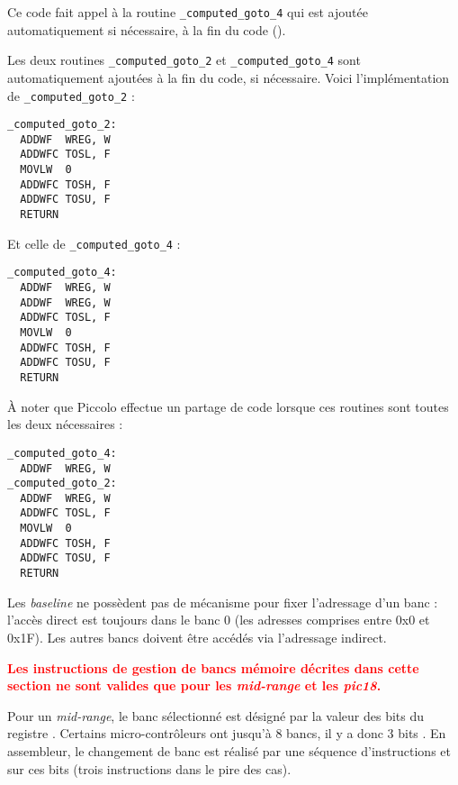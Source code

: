 Ce code fait appel à la routine \texttt{\_computed\_goto\_4} qui est ajoutée automatiquement si nécessaire, à la fin du code (). 





Les deux routines \texttt{\_computed\_goto\_2} et \texttt{\_computed\_goto\_4} sont automatiquement ajoutées à la fin du code, si nécessaire. Voici l'implémentation de \texttt{\_computed\_goto\_2} :
\begin{lstlisting}[language=assembleur]
_computed_goto_2:
  ADDWF  WREG, W
  ADDWFC TOSL, F
  MOVLW  0
  ADDWFC TOSH, F
  ADDWFC TOSU, F
  RETURN
\end{lstlisting}

Et celle de \texttt{\_computed\_goto\_4} :
\begin{lstlisting}[language=assembleur]
_computed_goto_4:
  ADDWF  WREG, W
  ADDWF  WREG, W
  ADDWFC TOSL, F
  MOVLW  0
  ADDWFC TOSH, F
  ADDWFC TOSU, F
  RETURN
\end{lstlisting}

À noter que Piccolo effectue un partage de code lorsque ces routines sont toutes les deux nécessaires :
\begin{lstlisting}[language=assembleur]
_computed_goto_4:
  ADDWF  WREG, W
_computed_goto_2:
  ADDWF  WREG, W
  ADDWFC TOSL, F
  MOVLW  0
  ADDWFC TOSH, F
  ADDWFC TOSU, F
  RETURN
\end{lstlisting}













Les \emph{baseline} ne possèdent pas de mécanisme pour fixer l'adressage d'un banc : l'accès direct est toujours dans le banc 0 (les adresses comprises entre 0x0 et 0x1F). Les autres bancs doivent être accédés via l'adressage indirect.

\textcolor{red}{\bf Les instructions de gestion de bancs mémoire décrites dans cette section ne sont valides que pour les \emph{mid-range} et les \emph{pic18}.}

Pour un \emph{mid-range}, le banc sélectionné est désigné par la valeur des bits  du registre . Certains micro-contrôleurs ont jusqu'à 8 bancs, il y a donc 3 bits . En assembleur, le changement de banc est réalisé par une séquence d'instructions  et  sur ces bits (trois instructions dans le pire des cas). 


